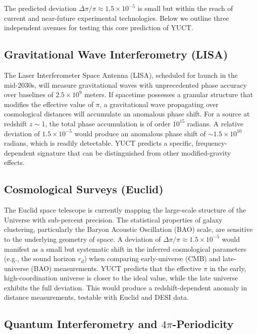 \documentclass[12pt,a4paper]{article}
\begin{document}
{	The predicted deviation \(\Delta\pi/\pi \approx 1.5\times10^{-5}\) is small but within the reach of current and near-future experimental technologies. Below we outline three independent avenues for testing this core prediction of YUCT.
	
	\subsection{Gravitational Wave Interferometry (LISA)}
	
	The Laser Interferometer Space Antenna (LISA), scheduled for launch in the mid-2030s, will measure gravitational waves with unprecedented phase accuracy over baselines of \(2.5\times10^9\) meters. If spacetime possesses a granular structure that modifies the effective value of \(\pi\), a gravitational wave propagating over cosmological distances will accumulate an anomalous phase shift. For a source at redshift \(z \sim 1\), the total phase accumulation is of order \(10^{15}\) radians. A relative deviation of \(1.5\times10^{-5}\) would produce an anomalous phase shift of \(\sim 1.5\times10^{10}\) radians, which is readily detectable. YUCT predicts a specific, frequency-dependent signature that can be distinguished from other modified-gravity effects.
	
	\subsection{Cosmological Surveys (Euclid)}
	
	The Euclid space telescope is currently mapping the large-scale structure of the Universe with sub-percent precision. The statistical properties of galaxy clustering, particularly the Baryon Acoustic Oscillation (BAO) scale, are sensitive to the underlying geometry of space. A deviation of \(\Delta\pi/\pi \approx 1.5\times10^{-5}\) would manifest as a small but systematic shift in the inferred cosmological parameters (e.g., the sound horizon \(r_d\)) when comparing early-universe (CMB) and late-universe (BAO) measurements. YUCT predicts that the effective \(\pi\) in the early, high-coordination universe is closer to the ideal value, while the late universe exhibits the full deviation. This would produce a redshift-dependent anomaly in distance measurements, testable with Euclid and DESI data.
	
	\subsection{Quantum Interferometry and \(4\pi\)-Periodicity}
	
}
\end{document}
